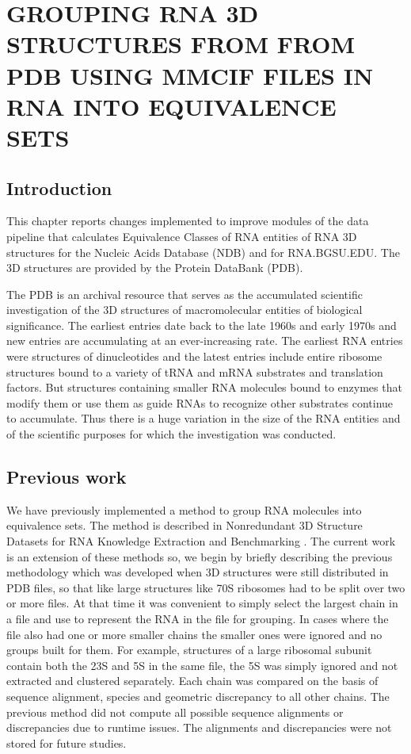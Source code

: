 \chapter{GROUPING RNA 3D STRUCTURES FROM FROM PDB USING MMCIF FILES IN RNA INTO
EQUIVALENCE SETS}

\section{Introduction}

This chapter reports changes implemented to improve modules of the data pipeline
that calculates Equivalence Classes of RNA entities of RNA 3D structures for the
Nucleic Acids Database (NDB) and for RNA.BGSU.EDU. The 3D structures are
provided by the Protein DataBank (PDB).

The PDB is an archival resource that serves as  the accumulated scientific
investigation of the 3D structures of macromolecular entities of biological
significance. The earliest entries date back to the late 1960s and early 1970s
and new entries are accumulating at an ever-increasing rate. The earliest RNA
entries were structures of dinucleotides and the latest entries include entire
ribosome structures bound to a variety of tRNA and mRNA substrates and
translation factors. But structures containing smaller RNA molecules bound to
enzymes that modify them or use them as guide RNAs  to recognize other
substrates continue to accumulate. Thus there is a huge variation in the size of
the RNA entities and of the scientific purposes for which the investigation was
conducted.

\section{Previous work}

We have previously implemented a method to group RNA molecules into equivalence
sets. The method is described in Nonredundant 3D Structure Datasets for RNA
Knowledge Extraction and Benchmarking \cite{Leontis2012b}. The current work is
an extension of these methods so, we begin by briefly describing the previous
methodology which was developed when 3D structures were still distributed in PDB
files, so that like large structures like 70S ribosomes had to be split over two
or more files. At that time it was convenient to simply select the largest chain
in a file and use to represent the RNA in the file for grouping. In cases where
the file also had one or more smaller chains the smaller ones were ignored and
no groups built for them. For example, structures of a large ribosomal subunit
contain both the 23S and 5S in the same file, the 5S was simply ignored and not
extracted and clustered separately. Each chain was compared on the basis of
sequence alignment, species and geometric discrepancy to all other chains. The
previous method did not compute all possible sequence alignments or
discrepancies due to runtime issues. The alignments and discrepancies were not
stored for future studies.

